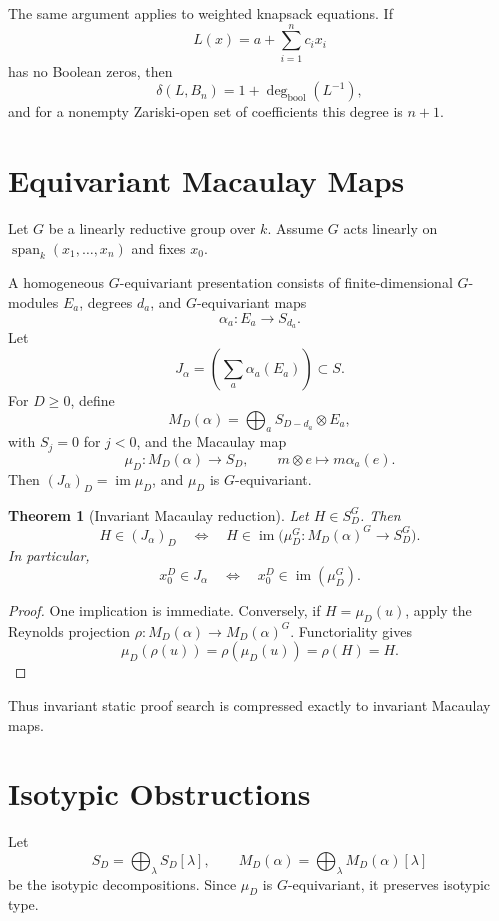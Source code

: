 \documentclass[11pt]{article}
\newtheorem{theorem}{Theorem}[section]
\DeclareMathOperator{\im}{im}
\begin{document}
The same argument applies to weighted knapsack equations. If
\[
L(x)=a+\sum_{i=1}^n c_i x_i
\]
has no Boolean zeros, then
\[
\delta(L,B_n)=1+\deg_{\mathrm{bool}}(L^{-1}),
\]
and for a nonempty Zariski-open set of coefficients this degree is \(n+1\).

\section{Equivariant Macaulay Maps}

Let \(G\) be a linearly reductive group over \(k\). Assume \(G\) acts linearly on \(\operatorname{span}_k(x_1,\ldots,x_n)\) and fixes \(x_0\).

A homogeneous \(G\)-equivariant presentation consists of finite-dimensional \(G\)-modules \(E_a\), degrees \(d_a\), and \(G\)-equivariant maps
\[
\alpha_a:E_a\to S_{d_a}.
\]
Let
\[
J_\alpha=\left(\sum_a \alpha_a(E_a)\right)\subset S.
\]
For \(D\ge0\), define
\[
M_D(\alpha)=\bigoplus_a S_{D-d_a}\otimes E_a,
\]
with \(S_j=0\) for \(j<0\), and the Macaulay map
\[
\mu_D:M_D(\alpha)\to S_D,\qquad m\otimes e\mapsto m\alpha_a(e).
\]
Then \((J_\alpha)_D=\im\mu_D\), and \(\mu_D\) is \(G\)-equivariant.

\begin{theorem}[Invariant Macaulay reduction]
Let \(H\in S_D^G\). Then
\[
H\in (J_\alpha)_D
\quad\Longleftrightarrow\quad
H\in \im\bigl(\mu_D^G:M_D(\alpha)^G\to S_D^G\bigr).
\]
In particular,
\[
x_0^D\in J_\alpha
\quad\Longleftrightarrow\quad
x_0^D\in \im(\mu_D^G).
\]
\end{theorem}

\begin{proof}
One implication is immediate. Conversely, if \(H=\mu_D(u)\), apply the Reynolds projection \(\rho:M_D(\alpha)\to M_D(\alpha)^G\). Functoriality gives
\[
\mu_D(\rho(u))=\rho(\mu_D(u))=\rho(H)=H.
\]
\end{proof}

Thus invariant static proof search is compressed exactly to invariant Macaulay maps.

\section{Isotypic Obstructions}

Let
\[
S_D=\bigoplus_\lambda S_D[\lambda],
\qquad
M_D(\alpha)=\bigoplus_\lambda M_D(\alpha)[\lambda]
\]
be the isotypic decompositions. Since \(\mu_D\) is \(G\)-equivariant, it preserves isotypic type.
\end{document}
